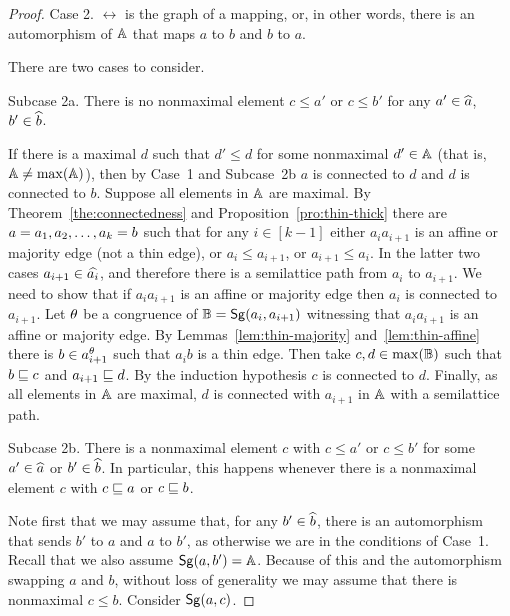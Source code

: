 \documentclass[11pt]{article}
\begin{document}
\begin{proof}
\smallskip

{\sc Case 2.}
$\rel$ is the graph of a mapping, or, in other words, there is an automorphism of 
${\mathbb A}$ that maps $a$ to $b$ and $b$ to $a$.

\smallskip

There are two cases to consider.

\smallskip

{\sc Subcase 2a.}
There is no nonmaximal element $c\le a'$ or $c\le b'$ for any $a'\in\widehat a$, $b'\in \widehat b$. 

\smallskip

If there is a maximal $d$ such that $d'\le d$ for some nonmaximal $d'\in{\mathbb A}$ 
(that is, ${\mathbb A}\ne\max({\mathbb A})$), then 
by Case~1 and Subcase~2b $a$ is connected to $d$ and $d$ is connected to $b$.
Suppose all elements in ${\mathbb A}$ are maximal. 
By Theorem~\ref{the:connectedness} and Proposition~\ref{pro:thin-thick} there are 
$a=a_1,a_2,\ldots, a_k=b$ such that for any $i\in[k-1]$ either $a_ia_{i+1}$ is an 
affine or majority edge (not a thin edge), or $a_i\le a_{i+1}$, or $a_{i+1}\le a_i$. 
In the latter two cases $a_{i+1}\in\widehat{a_i}$, and therefore there is a semilattice 
path from $a_i$ to $a_{i+1}$. We need to show that if $a_ia_{i+1}$ is an affine 
or majority edge then $a_i$ is connected 
to $a_{i+1}$. Let $\theta$ be a congruence of ${\mathbb B}={\sf Sg}(a_i,a_{i+1})$ witnessing that 
$a_ia_{i+1}$ is an affine or majority edge. By Lemmas~\ref{lem:thin-majority} 
and~\ref{lem:thin-affine} there is $b\in a_{i+1}^\theta$ such that $a_ib$ is a
thin edge. Then take $c,d\in\max({\mathbb B})$ such that $b\sqsubseteq c$ 
and $a_{i+1}\sqsubseteq d$. By the induction hypothesis $c$ is connected 
to $d$. Finally, as all elements in ${\mathbb A}$ are maximal, $d$ is connected with 
$a_{i+1}$ in ${\mathbb A}$ with a semilattice path.

\smallskip

{\sc Subcase 2b.}
There is a nonmaximal element $c$ with $c\le a'$ or $c\le b'$ for some $a'\in \widehat a$ 
or $b'\in\widehat b$. In particular, this happens whenever there is a nonmaximal element 
$c$ with $c\sqsubseteq a$ or $c\sqsubseteq b$.

\smallskip

Note first that we may assume that, for any $b'\in\widehat b$, there is an 
automorphism that sends $b'$ to $a$ and $a$ to $b'$, as otherwise we are in the
conditions of Case~1. Recall that we also assume  
${\sf Sg}(a,b')={\mathbb A}$. Because of this and the automorphism swapping $a$ and $b$, 
without loss of generality we may assume that there is nonmaximal $c\le b$. 
Consider ${\sf Sg}(a,c)$.


\end{proof}
\end{document}
